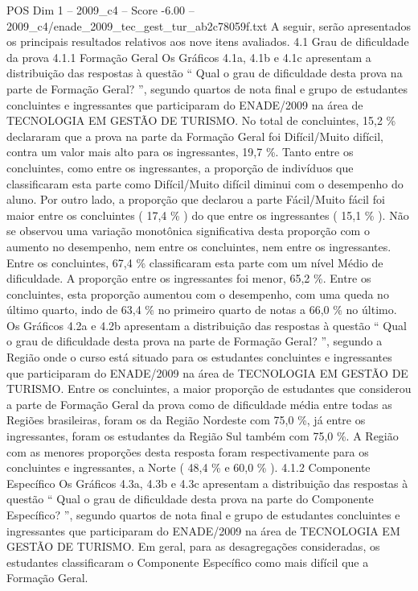 \begin{textsample}{POS Dim 1 – 2009\_c4 – Score -6.00 – 2009\_c4/enade\_2009\_tec\_gest\_tur\_ab2c78059f.txt}
A seguir, serão apresentados os principais resultados relativos aos nove itens avaliados. 4.1 Grau de dificuldade da prova 4.1.1 Formação Geral Os Gráficos 4.1a, 4.1b e 4.1c apresentam a distribuição das respostas à questão “ Qual o grau de dificuldade desta prova na parte de Formação Geral? ”, segundo quartos de nota final e grupo de estudantes concluintes e ingressantes que participaram do ENADE/2009 na área de TECNOLOGIA EM GESTÃO DE TURISMO.
No total de concluintes, 15,2 \% declararam que a prova na parte da Formação Geral foi Difícil/Muito difícil, contra um valor mais alto para os ingressantes, 19,7 \%.
Tanto entre os concluintes, como entre os ingressantes, a proporção de indivíduos que classificaram esta parte como Difícil/Muito difícil diminui com o desempenho do aluno.
Por outro lado, a proporção que declarou a parte Fácil/Muito fácil foi maior entre os concluintes ( 17,4 \% ) do que entre os ingressantes ( 15,1 \% ).
Não se observou uma variação monotônica significativa desta proporção com o aumento no desempenho, nem entre os concluintes, nem entre os ingressantes.
Entre os concluintes, 67,4 \% classificaram esta parte com um nível Médio de dificuldade.
A proporção entre os ingressantes foi menor, 65,2 \%.
Entre os concluintes, esta proporção aumentou com o desempenho, com uma queda no último quarto, indo de 63,4 \% no primeiro quarto de notas a 66,0 \% no último.
Os Gráficos 4.2a e 4.2b apresentam a distribuição das respostas à questão “ Qual o grau de dificuldade desta prova na parte de Formação Geral? ”, segundo a Região onde o curso está situado para os estudantes concluintes e ingressantes que participaram do ENADE/2009 na área de TECNOLOGIA EM GESTÃO DE TURISMO.
Entre os concluintes, a maior proporção de estudantes que considerou a parte de Formação Geral da prova como de dificuldade média entre todas as Regiões brasileiras, foram os da Região Nordeste com 75,0 \%, já entre os ingressantes, foram os estudantes da Região Sul também com 75,0 \%.
A Região com as menores proporções desta resposta foram respectivamente para os concluintes e ingressantes, a Norte ( 48,4 \% e 60,0 \% ). 4.1.2 Componente Específico Os Gráficos 4.3a, 4.3b e 4.3c apresentam a distribuição das respostas à questão “ Qual o grau de dificuldade desta prova na parte do Componente Específico? ”, segundo quartos de nota final e grupo de estudantes concluintes e ingressantes que participaram do ENADE/2009 na área de TECNOLOGIA EM GESTÃO DE TURISMO.
Em geral, para as desagregações consideradas, os estudantes classificaram o Componente Específico como mais difícil que a Formação Geral.

\end{textsample}

